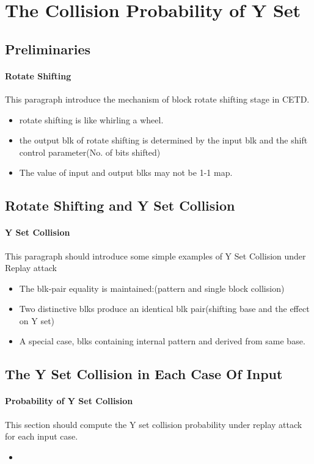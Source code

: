 \documentclass{article}
\begin{document}
\section{The Collision Probability of Y Set}
\subsection{Preliminaries}
\paragraph{Rotate Shifting}
This paragraph introduce the mechanism of block rotate shifting stage in CETD. 
\begin{itemize}
	\item rotate shifting is like whirling a wheel.
	\item the output blk of rotate shifting is determined by the input blk and the shift control parameter(No. of bits shifted)
	\item The value of input and output blks may not be 1-1 map.
\end{itemize}
\subsection{Rotate Shifting and Y Set Collision}
\paragraph{Y Set Collision}
This paragraph should introduce some simple examples of Y Set Collision under Replay attack
\begin{itemize}
	\item The blk-pair equality is maintained:(pattern and single block collision)
	\item Two distinctive blks produce an identical blk pair(shifting base and the effect on Y set)
	\item A special case, blks containing internal pattern and derived from same base. 
\end{itemize}
\subsection{The Y Set Collision in Each Case Of Input}
\paragraph{Probability of Y Set Collision}
This section should compute the Y set collision probability under replay attack for each input case.
\begin{itemize}
	\item 
\end{itemize}
\end{document}
